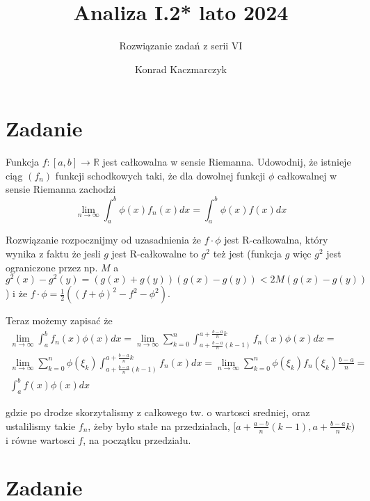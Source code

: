\documentclass[11pt]{scrartcl}
\author{Konrad Kaczmarczyk}
\begin{document}
  \title{Analiza I.2* lato 2024}
  \subtitle{Rozwiązanie zadań z serii VI}
  \maketitle
    \section{Zadanie}
        \begin{zadanie}
            Funkcja $f: [a,b] \to \mathbb{R} $ jest całkowalna w sensie Riemanna. Udowodnij, że istnieje ciąg $(f_n)$ funkcji schodkowych taki, że dla dowolnej funkcji $\phi$ całkowalnej w sensie Riemanna zachodzi
            \[
              \lim_{n \to \infty } \int_a^b \phi (x) f_n (x) dx = \int_a^b \phi(x) f(x) dx 
            \]
            
        \end{zadanie}

        Rozwiązanie rozpocznijmy od uzasadnienia że $f \cdot  \phi$ jest R-całkowalna, który wynika z faktu że jesli $g$ jest R-całkowalne to $g^2$ też jest (funkcja $g$ więc $g^2$ jest ograniczone przez np. $M$ a $g^2 (x) - g^2(y) = (g(x)+g(y))(g(x) - g(y)) < 2M (g(x) - g(y))$) i że $f \cdot \phi = \frac{1}{2} \left ( (f+\phi)^2 - f^2 - \phi^2 \right )$.

        Teraz możemy zapisać że
        \begin{gather*}
          \lim_{n \to \infty } \int_a^b f_n (x) \phi (x) dx = \lim_{n \to \infty } \sum_{k=0}^{n} \int_{a + \frac{b-a}{n} (k-1)}^{a+ \frac{b-a}{n} k } f_n(x) \phi(x) dx = \\
          \lim_{n \to \infty } \sum_{k=0}^{n} \phi (\xi_k) \int_{a + \frac{b-a}{n} (k-1)}^{a+ \frac{b-a}{n} k } f_n(x) dx =
          \lim_{n \to \infty } \sum_{k=0}^{n} \phi ( \xi_k ) f_n ( \xi_k ) \frac{b-a}{n} = \\
          \int_a^b f(x) \phi (x) dx
        \end{gather*}

        gdzie po drodze skorzytalismy z całkowego tw. o wartosci sredniej, oraz ustalilismy takie $f_n$, żeby było stałe na przedziałach, $[ a + \frac{a-b}{n}(k-1) , a + \frac{b-a}{n} k)$ i równe wartosci $f$, na początku przedziału.

      \newpage
        

      \section{Zadanie}
      
\end{document}
